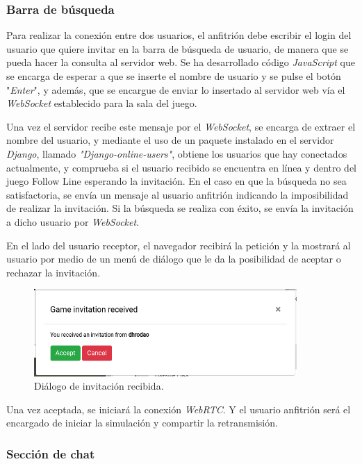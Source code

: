 \documentclass[a4paper, 12pt]{book}
\begin{document}
\subsubsection{Barra de búsqueda}

Para realizar la conexión entre dos usuarios, el anfitrión debe escribir el login del usuario que quiere invitar en la barra de búsqueda de usuario, de manera que se pueda hacer la consulta al servidor web. Se ha desarrollado código \emph{JavaScript} que se encarga de esperar a que se inserte el nombre de usuario y se pulse el botón "\emph{Enter}", y además, que se encargue de enviar lo insertado al servidor web vía el \emph{WebSocket} establecido para la sala del juego.

Una vez el servidor recibe este mensaje por el \emph{WebSocket}, se encarga de extraer el nombre del usuario, y mediante el uso de un paquete instalado en el servidor \emph{Django}, llamado \emph{"Django-online-users"}, obtiene los usuarios que hay conectados actualmente, y comprueba si el usuario recibido se encuentra en línea y dentro del juego Follow Line esperando la invitación. En el caso en que la búsqueda no sea satisfactoria, se envía un mensaje al usuario anfitrión indicando la imposibilidad de realizar la invitación. Si la búsqueda se realiza con éxito, se envía la invitación a dicho usuario por \emph{WebSocket}.

En el lado del usuario receptor, el navegador recibirá la petición y la mostrará al usuario por medio de un menú de diálogo que le da la posibilidad de aceptar o rechazar la invitación.
\begin{figure}[H]
	\centering
    \includegraphics[width=10cm]{img/invitation.png}
    \caption{Diálogo de invitación recibida.}
    \label{figura:diagrama_conexion_webrtc}
\end{figure}


Una vez aceptada, se iniciará la conexión \emph{WebRTC}. Y el usuario anfitrión será el encargado de iniciar la simulación y compartir la retransmisión.

\subsubsection{Sección de chat}
\end{document}
